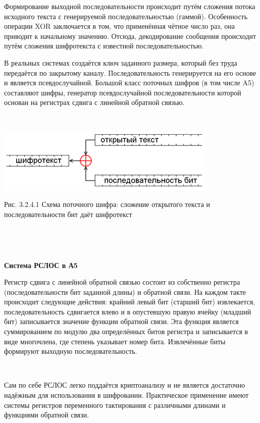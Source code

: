 \documentclass[a4paper]{report}
\begin{document}
Формирование выходной последовательности происходит путём сложения потока исходного текста с генерируемой последовательностью (гаммой). Особенность операции XOR заключается в том, что применённая чётное число раз, она приводит к начальному значению. Отсюда, декодирование сообщения происходит путём сложения шифротекста с известной последовательностью.

В реальных системах создаётся ключ заданного размера, который без труда передаётся по закрытому каналу. Последовательность генерируется на его основе и является псевдослучайной. Большой класс поточных шифров (в том числе A5) составляют шифры, генератор псевдослучайной последовательности которой основан на регистрах сдвига с линейной обратной связью.

~

\includegraphics[scale=1.1]{Поточный_шифр}
{\centering\caption{\newline Рис. 3.2.4.1 Схема поточного шифра: сложение открытого текста и последовательности бит даёт шифротекст}\\}

~

\textbf{Система РСЛОС в А5}

Регистр сдвига с линейной обратной связью состоит из собственно регистра (последовательности бит заданной длины) и обратной связи. На каждом такте происходит следующие действия: крайний левый бит (старший бит) извлекается, последовательность сдвигается влево и в опустевшую правую ячейку (младший бит) записывается значение функции обратной связи. Эта функция является суммированием по модулю два определённых битов регистра и записывается в виде многочлена, где степень указывает номер бита. Извлечённые биты формируют выходную последовательность.

~

Сам по себе РСЛОС легко поддаётся криптоанализу и не является достаточно надёжным для использования в шифровании. Практическое применение имеют системы регистров переменного тактирования с различными длинами и функциями обратной связи.
\end{document}
